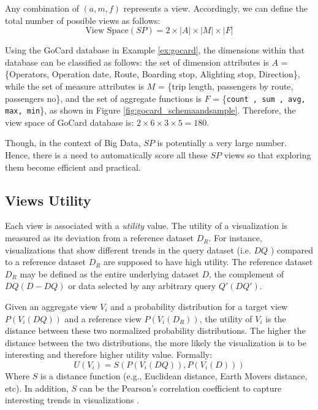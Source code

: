 Any combination of $(a, m, f)$ represents a view. Accordingly, we can define the total number of possible views as follows:
%
%
\begin{equation}
\text{View Space} (SP) = 2 \times |A| \times |M| \times|F|
\label{eq:viewspace}
\end{equation}
%
%
%
%
\begin{example}
  \label{ex:gocard_sp}
Using the GoCard database in Example \ref{ex:gocard}, the dimensions within that database can be classified as follows: the set of dimension attributes is $A$ = \{Operators, Operation date, Route, Boarding stop, Alighting stop, Direction\}, while the set of measure attributes is $M$ = \{trip length, passengers by route, passengers no\}, and the set of aggregate functions is $F$ = \{\texttt{count , sum , avg, max, min}\}, as shown in Figure \ref{fig:gocard_schemaandsample}.
%
Therefore, the view space of GoCard database is: $ 2 \times 6 \times 3 \times 5 = 180 $.
%
\end{example}
%
%
Though, in the context of Big Data, $SP$ is potentially a very large number. 
%
Hence, there is a need to automatically score all these $SP$ views so that exploring them become efficient and practical.
%

\subsection{Views Utility}
%
Each view is associated with a \emph{utility} value.
%
%
The utility of a visualization is measured as its deviation from a reference dataset $D_R$.
%
For instance, visualizations that show different trends in the query dataset (i.e. $DQ$ ) compared to a reference dataset $D_R$ are supposed to have high utility.
%
The reference dataset $D_R$ may be defined as the entire underlying dataset $D$, the complement of $DQ (D - DQ)$ 
or data selected by any arbitrary query $Q'(DQ')$.
%

Given an aggregate view $V_i$ and a probability distribution for a target view $P(V_i(DQ))$ and a reference view $P(V_i(D_R))$, the utility of $V_i$ is the distance between these two normalized probability distributions.
% 
The higher the distance between the two distributions, the more likely the visualization is to be interesting and therefore higher utility value.
%
%
Formally:
%
\begin{equation}
\label{eq:utility}
U(V_i) = S( P(V_i(DQ)), P(V_i(D)) )
\end{equation}
%
Where $S$ is a distance function (e.g., Euclidean distance, Earth Movers distance, etc).
%
In addition, $S$ can be the Pearson's correlation coefficient  to capture interesting trends in visualizations .
%
%


